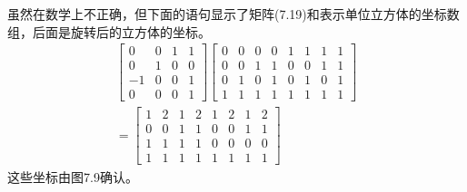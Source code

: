 虽然在数学上不正确，但下面的语句显示了矩阵(7.19)和表示单位立方体的坐标数组，后面是旋转后的立方体的坐标。
$$
\begin{gathered}
{\left[\begin{array}{cccc}
0 & 0 & 1 & 1 \\
0 & 1 & 0 & 0 \\
-1 & 0 & 0 & 1 \\
0 & 0 & 0 & 1
\end{array}\right]\left[\begin{array}{llllllll}
0 & 0 & 0 & 0 & 1 & 1 & 1 & 1 \\
0 & 0 & 1 & 1 & 0 & 0 & 1 & 1 \\
0 & 1 & 0 & 1 & 0 & 1 & 0 & 1 \\
1 & 1 & 1 & 1 & 1 & 1 & 1 & 1
\end{array}\right]} \\
=\left[\begin{array}{llllllll}
1 & 2 & 1 & 2 & 1 & 2 & 1 & 2 \\
0 & 0 & 1 & 1 & 0 & 0 & 1 & 1 \\
1 & 1 & 1 & 1 & 0 & 0 & 0 & 0 \\
1 & 1 & 1 & 1 & 1 & 1 & 1 & 1
\end{array}\right]
\end{gathered}
$$
这些坐标由图7.9确认。


